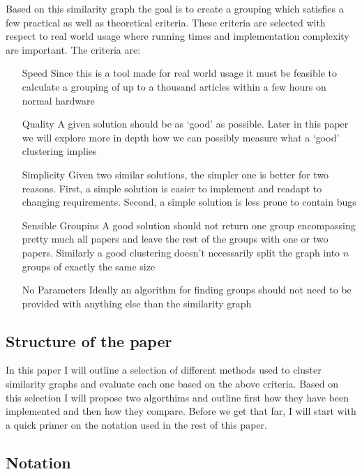 Based on this similarity graph the goal is to create a grouping which 
satisfies a few practical as well as theoretical criteria. These 
criteria are selected with respect to real world usage where running 
times and implementation complexity are important.  The criteria are:
\begin{itemize}
	\item[Speed]{Since this is a tool made for real world usage it must 
			be feasible to calculate a grouping of up to a thousand 
		articles within a few hours on normal hardware}
	\item[Quality]{A given solution should be as `good' as possible.  
			Later in this paper we will explore more in depth how we can 
		possibly measure what a `good' clustering implies}
	\item[Simplicity]{Given two similar solutions, the simpler one is 
			better for two reasons. First, a simple solution is easier 
			to implement and readapt to changing requirements. Second, a 
		simple solution is less prone to contain bugs}
	\item[Sensible Groupins]{A good solution should not return one group 
			encompassing pretty much all papers and leave the rest of 
			the groups with one or two papers. Similarly a good 
			clustering doesn't necessarily split the graph into $n$ 
		groups of exactly the same size}
	\item[No Parameters]{Ideally an algorithm for finding groups should 
		not need to be provided with anything else than the similarity 
	graph}
\end{itemize}

\subsection{Structure of the paper}

In this paper I will outline a selection of different methods used to 
cluster similarity graphs and evaluate each one based on the above 
criteria. Based on this selection I will propose two algorthims and 
outline first how they have been implemented and then how they compare.  
Before we get that far, I will start with a quick primer on the notation 
used in the rest of this paper.

\subsection{Notation}

